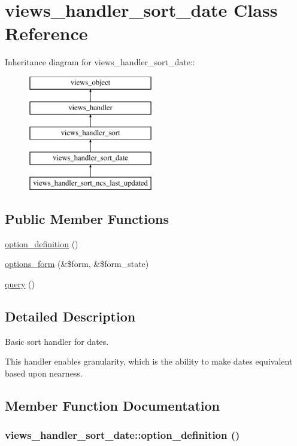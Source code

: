 \hypertarget{classviews__handler__sort__date}{
\section{views\_\-handler\_\-sort\_\-date Class Reference}
\label{classviews__handler__sort__date}
}
Inheritance diagram for views\_\-handler\_\-sort\_\-date::\begin{figure}[H]
\begin{center}
\leavevmode
\includegraphics[height=5cm]{classviews__handler__sort__date}
\end{center}
\end{figure}
\subsection*{Public Member Functions}
\begin{CompactItemize}
\item 
\hyperlink{classviews__handler__sort__date_e46b66b6623fc747b821664b60c98b10}{option\_\-definition} ()
\item 
\hyperlink{classviews__handler__sort__date_622c39d35c93e620cc6fa6ae2ab37ab4}{options\_\-form} (\&\$form, \&\$form\_\-state)
\item 
\hyperlink{classviews__handler__sort__date_3d3680d96fee82a746bac50c051016a8}{query} ()
\end{CompactItemize}


\subsection{Detailed Description}
Basic sort handler for dates.

This handler enables granularity, which is the ability to make dates equivalent based upon nearness. 

\subsection{Member Function Documentation}
\hypertarget{classviews__handler__sort__date_e46b66b6623fc747b821664b60c98b10}{
\subsubsection[{option\_\-definition}]{\setlength{\rightskip}{0pt plus 5cm}views\_\-handler\_\-sort\_\-date::option\_\-definition ()}}
\label{classviews__handler__sort__date_e46b66b6623fc747b821664b60c98b10}


